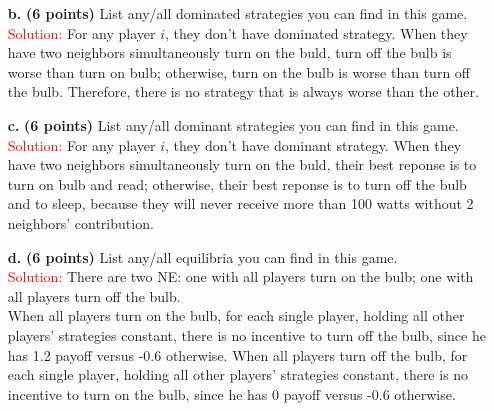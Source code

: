 \documentclass[11pt]{article} %
\begin{document}
\begin{itemize}
\begin{itemize}
\end{itemize}

\item[\textbf{b.}] \textbf{(6 points)}  List any/all dominated strategies you can find in this game. \\

\textcolor{red}{Solution:}
For any player $i$, they don't have dominated strategy. When they have two neighbors simultaneously turn on the buld, turn off the bulb is worse than turn on bulb; otherwise, turn on the bulb is worse than turn off the bulb. Therefore, there is no strategy that is always worse than the other. 

\item[\textbf{c.}] \textbf{(6 points)}  List any/all  dominant strategies you can find in this game.\\

\textcolor{red}{Solution:}
For any player $i$, they don't have dominant strategy. When they have two neighbors simultaneously turn on the buld, their best reponse is to turn on bulb and read; otherwise, their best reponse is to turn off the bulb and to sleep, because they will never receive more than 100 watts without 2 neighbors' contribution. 


\item[\textbf{d.}] \textbf{(6 points)}   List any/all equilibria you can find in this game.\\

\textcolor{red}{Solution:} There are two NE: one with all players turn on the bulb; one with all players turn off the bulb.\\

When all players turn on the bulb, for each single player, holding all other players' strategies constant, there is no incentive to turn off the bulb, since he has 1.2 payoff versus -0.6 otherwise. When all players turn off the bulb, for each single player, holding all other players' strategies constant, there is no incentive to turn on the bulb, since he has 0 payoff versus -0.6 otherwise.

 
\end{itemize}
\end{document}
